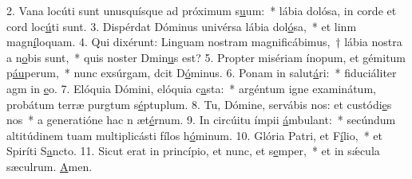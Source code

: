 2. Vana locúti sunt unusquísque ad próximum s\uline{u}um:~* lábia dolósa, in corde et cord loc\uline{ú}ti sunt.
3. Dispérdat Dóminus univérsa lábia dol\uline{ó}sa,~* et linm magn\uline{í}loquam.
4. Qui dixérunt: Linguam nostram magnificábimus,~† lábia nostra a n\uline{o}bis sunt,~* quis noster Dmin\uline{u}s est?
5. Propter misériam ínopum, et gémitum p\uline{áu}perum,~* nunc exsúrgam, dcit D\uline{ó}minus.
6. Ponam in salut\uline{á}ri:~* fiduciáliter agm in \uline{e}o.
7. Elóquia Dómini, elóquia c\uline{a}sta:~* argéntum igne examinátum, probátum terræ purgtum s\uline{é}ptuplum.
8. Tu, Dómine, servábis nos: et custódi\uline{e}s nos~* a generatióne hac n æt\uline{é}rnum.
9. In circúitu ímpii \uline{á}mbulant:~* secúndum altitúdinem tuam multiplicásti fílos h\uline{ó}minum.
10. Glória Patri, et F\uline{í}lio,~* et Spiríti S\uline{a}ncto.
11. Sicut erat in princípio, et nunc, et s\uline{e}mper,~* et in sǽcula sæculrum. \uline{A}men.
